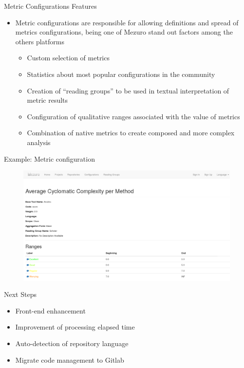 \begin{block}{Metric Configurations Features}
    \begin{itemize}
        \item Metric configurations are responsible for allowing
            definitions and spread of metrics configurations, being
            one of Mezuro stand out factors among the others platforms
            \begin{itemize}
                \item Custom selection of metrics
                \item Statistics about most popular configurations in the
                    community
                \item Creation of ``reading groups'' to be used in textual
                    interpretation of metric results
                \item Configuration of qualitative ranges associated with the
                    value of metrics
                \item Combination of native metrics to create composed and more
                    complex analysis
            \end{itemize}
    \end{itemize}
\end{block}

\begin{block}{Example: Metric configuration}
    \begin{figure}
        \begin{center}
            \includegraphics[width=\textwidth]{figures/MetricConfiguration.png}
            \label{fig:feature1}
        \end{center}
    \end{figure}
\end{block}

\begin{block}{Next Steps}
    \begin{itemize}
        \item Front-end enhancement
        \item Improvement of processing elapsed time
        \item Auto-detection of repository language
        \item Migrate code management to Gitlab
    \end{itemize}
\end{block}
